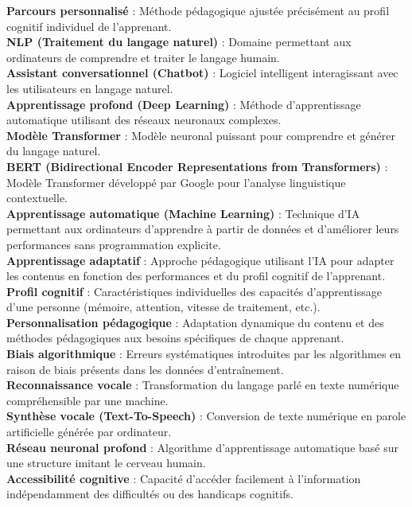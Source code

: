 \documentclass[12pt,a4paper]{report}
\begin{document}
\textbf{Parcours personnalisé} : Méthode pédagogique ajustée précisément au profil cognitif individuel de l'apprenant.\\
\textbf{NLP (Traitement du langage naturel)} : Domaine permettant aux ordinateurs de comprendre et traiter le langage humain.\\
\textbf{Assistant conversationnel (Chatbot)} : Logiciel intelligent interagissant avec les utilisateurs en langage naturel.\\
\textbf{Apprentissage profond (Deep Learning)} : Méthode d’apprentissage automatique utilisant des réseaux neuronaux complexes.\\
\textbf{Modèle Transformer} : Modèle neuronal puissant pour comprendre et générer du langage naturel.\\
\textbf{BERT (Bidirectional Encoder Representations from Transformers)} : Modèle Transformer développé par Google pour l'analyse linguistique contextuelle.\\
\textbf{Apprentissage automatique (Machine Learning)} : Technique d’IA permettant aux ordinateurs d’apprendre à partir de données et d’améliorer leurs performances sans programmation explicite.\\
\textbf{Apprentissage adaptatif} : Approche pédagogique utilisant l’IA pour adapter les contenus en fonction des performances et du profil cognitif de l’apprenant.\\
\textbf{Profil cognitif} : Caractéristiques individuelles des capacités d’apprentissage d’une personne (mémoire, attention, vitesse de traitement, etc.).\\
\textbf{Personnalisation pédagogique} : Adaptation dynamique du contenu et des méthodes pédagogiques aux besoins spécifiques de chaque apprenant.\\
\textbf{Biais algorithmique} : Erreurs systématiques introduites par les algorithmes en raison de biais présents dans les données d’entraînement.\\
\textbf{Reconnaissance vocale} : Transformation du langage parlé en texte numérique compréhensible par une machine.\\
\textbf{Synthèse vocale (Text-To-Speech)} : Conversion de texte numérique en parole artificielle générée par ordinateur.\\
\textbf{Réseau neuronal profond} : Algorithme d’apprentissage automatique basé sur une structure imitant le cerveau humain.\\
\textbf{Accessibilité cognitive} : Capacité d'accéder facilement à l’information indépendamment des difficultés ou des handicaps cognitifs.\\
\end{document}

